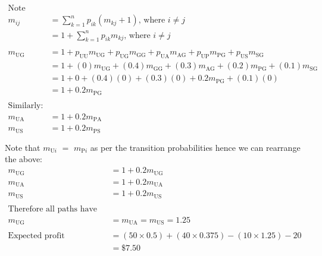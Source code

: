 \documentclass[12pt]{article}
\begin{document}
\begin{align*}
\text{Note that:}\\
m_{ij} & = \sum_{k=1}^{n} p_{ik}(m_{kj}+1) \text{, where } i \neq j\\
& = 1 + \sum_{k=1}^{n} p_{ik}m_{kj} \text{, where } i \neq j\\
& \\
m_{\text{UG}} &= 1 + p_{\text{UU}}m_{\text{UG}} + p_{\text{UG}}m_{\text{GG}} + p_{\text{UA}}m_{\text{AG}} + p_{\text{UP}}m_{\text{PG}} + p_{\text{US}}m_{\text{SG}}\\
&= 1 + (0)m_{\text{UG}} + (0.4)m_{\text{GG}} + (0.3)m_{\text{AG}} + (0.2)m_{\text{PG}} + (0.1)m_{\text{SG}}\\
& = 1 + 0 + (0.4)(0) + (0.3)(0) + 0.2m_{\text{PG}} + (0.1)(0)\\
& = 1 + 0.2m_{\text{PG}}\\
& \\
\text{Similarly:}\\
m_{\text{UA}} &= 1 + 0.2m_{\text{PA}}\\
m_{\text{US}} &= 1 + 0.2m_{\text{PS}}\\
& \\
\end{align*}
Note that $m_{\text{U}i}$ $=$ $m_{\text{P}i}$ as per the transition probabilities hence we can rearrange the above:
\begin{align*}
m_{\text{UG}} &= 1 + 0.2m_{\text{UG}}\\
m_{\text{UA}} &= 1 + 0.2m_{\text{UA}}\\
m_{\text{US}} &= 1 + 0.2m_{\text{US}}\\
& \\
\text{Therefore all paths have the same mean hitting time:}\\
m_{\text{UG}} &= m_{\text{UA}} = m_{\text{US}} = 1.25\\
& \\
\text{Expected profit} & = (50\times0.5) + (40\times0.375) - (10\times1.25) - 20\\
& = \$7.50
\end{align*}
\end{document}
